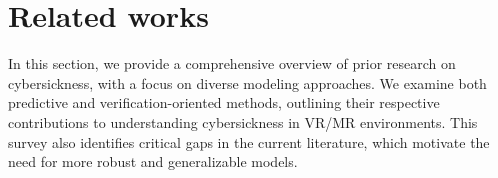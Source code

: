 \documentclass{vgtc}                          %
\begin{document}
\section{Related works}
In this section, we provide a comprehensive overview of prior research on cybersickness, with a focus on diverse modeling approaches. We examine both predictive and verification-oriented methods, outlining their respective contributions to understanding cybersickness in VR/MR environments. This survey also identifies critical gaps in the current literature, which motivate the need for more robust and generalizable models.

\end{document}
